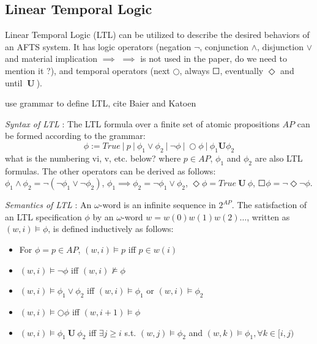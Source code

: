 \subsection{Linear Temporal Logic}

Linear Temporal Logic (LTL) can be utilized to describe the desired behaviors of an AFTS system. It has logic operators (negation $ \neg $, conjunction $ \wedge $, disjunction $ \vee $ and material implication $ \implies $ {\color{purple} $\implies$ is not used in the paper, do we need to mention it ?}), and temporal operators (next $ \bigcirc $, always $ \Square $, eventually $ \Diamond $ and until $ \mathbf{\ U\ }$).

{\color{blue} use grammar to define LTL, cite Baier and Katoen}

{\color{teal}\emph{ Syntax of LTL} \cite{baier2008principles}: The LTL formula over a finite set of atomic propositions $ AP $ can be formed according to the grammar:}
\begin{displaymath}
	\phi := True\ \vert\ p\ \vert\ \phi_1 \vee \phi_2\ \vert\ \neg \phi\ \vert\ \bigcirc \phi\ \vert\ \phi_1 \mathbf{U}\phi_2
\end{displaymath}
{\color{blue}what is the numbering vi, v, etc. below?} where $ p\in AP $, $ \phi_1 $ and $ \phi_2 $ are also LTL formulas. The other operators can be derived as follows: $ \phi_1 \wedge \phi_2 = \neg (\neg \phi_1 \vee \neg \phi_2) $, $ \phi_1 \implies \phi_2 = \neg \phi_1 \vee \phi_2 $, $ \Diamond \phi = True \mathbf{\ U\ } \phi $, $ \Square \phi = \neg \Diamond \neg \phi $.

{\color{teal}\emph{Semantics of LTL} \cite{Nilsson2017}:} An $\omega$-word is an infinite sequence in $ 2^{AP}$.  The satisfaction of an LTL specification $ \phi $ by an $\omega$-word $ w = w(0)w(1)w(2)\dots $, written as $ (w,i) \models \phi $, is defined inductively as follows:
\begin{itemize}
	\item For $ \phi = p \in AP $, $ (w,i)\models p $ iff $ p\in w(i) $ 
	\item $ (w,i)\models \neg \phi $ iff $ (w,i)\not\models \phi $
	\item $ (w,i)\models  \phi_1 \vee \phi_2 $ iff $ (w,i)\models \phi_1 $ or $ (w,i)\models \phi_2 $
	\item $ (w,i) \models \bigcirc \phi $ iff $ (w,i+1) \models \phi $
	\item $ (w,i)\models \phi_1 \mathbf{\ U\ } \phi_2 $ iff $\exists j\geq i  $ s.t. $ (w,j)\models \phi_2 $ and $ (w,k)\models \phi_1, \forall k\in [i,j) $
\end{itemize} 

